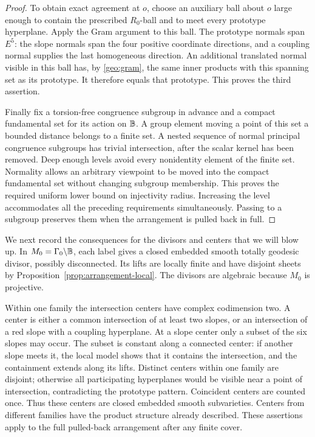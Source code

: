 \begin{proof}
To obtain exact agreement at $o$, choose an auxiliary ball about $o$
large enough to contain the prescribed $R_0$-ball and to meet every
prototype hyperplane.  Apply the Gram argument to this ball.  The
prototype normals span $E^5$: the slope normals span the four positive
coordinate directions, and a coupling normal supplies the last
homogeneous direction.  An additional translated normal visible in
this ball has, by \eqref{geo:gram}, the same inner products with this
spanning set as its prototype.  It therefore equals that prototype.
This proves the third assertion.

Finally fix a torsion-free congruence subgroup in advance and a compact
fundamental set for its action on $\mathbb B$.  A group element moving a point
of this set a bounded distance belongs to a finite set.  A nested
sequence of normal principal congruence subgroups has trivial
intersection, after the scalar kernel has been removed.  Deep enough
levels avoid every nonidentity element of the finite set.  Normality
allows an arbitrary viewpoint to be moved into the compact fundamental
set without changing subgroup membership.  This proves the required
uniform lower bound on injectivity radius.  Increasing the level
accommodates all the preceding requirements simultaneously.  Passing
to a subgroup preserves them when the arrangement is pulled back in
full.
\end{proof}

We next record the consequences for the divisors and centers that we
will blow up.  In $M_0=\Gamma_0\backslash\mathbb B$, each label gives a closed
embedded smooth totally geodesic divisor, possibly disconnected.  Its
lifts are locally finite and have disjoint sheets by
Proposition~\ref{prop:arrangement-local}.  The divisors are algebraic
because $M_0$ is projective.

Within one family the intersection centers have complex codimension
two.  A center is either a common intersection of at least two slopes,
or an intersection of a red slope with a coupling hyperplane.  At a
slope center only a subset of the six slopes may occur.  The subset is
constant along a connected center: if another slope meets it, the
local model shows that it contains the intersection, and the
containment extends along its lifts.  Distinct centers within one
family are disjoint; otherwise all participating hyperplanes would be
visible near a point of intersection, contradicting the prototype
pattern.  Coincident centers are counted once.  Thus these centers are
closed embedded smooth subvarieties.  Centers from different families
have the product structure already described.  These assertions apply
to the full pulled-back arrangement after any finite cover.

